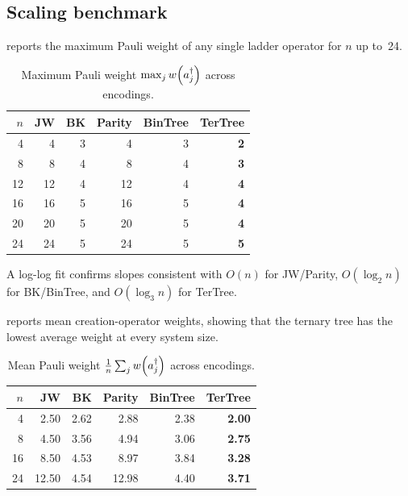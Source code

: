 \subsection{Scaling benchmark}
\label{sec:val-scaling}

 reports the maximum Pauli weight of any single
ladder operator for $n$ up to~24.

\begin{table}[t]
\centering
\caption{Maximum Pauli weight $\max_j w\!\left(a_{j}^{\dagger}\right)$ across encodings.}
\label{tab:scaling}
\begin{tabular}{@{}rrrrrr@{}}
\toprule
$n$ & JW & BK & Parity & BinTree & TerTree \\
\midrule
 4  &  4 &  3 &  4 &  3 & \textbf{2} \\
 8  &  8 &  4 &  8 &  4 & \textbf{3} \\
12  & 12 &  4 & 12 &  4 & \textbf{4} \\
16  & 16 &  5 & 16 &  5 & \textbf{4} \\
20  & 20 &  5 & 20 &  5 & \textbf{4} \\
24  & 24 &  5 & 24 &  5 & \textbf{5} \\
\bottomrule
\end{tabular}
\end{table}

A log-log fit confirms slopes consistent with $O(n)$ for JW/Parity,
$O(\log_2 n)$ for BK/BinTree, and $O(\log_3 n)$ for TerTree.

 reports mean creation-operator weights,
showing that the ternary tree has the lowest average weight at every
system size.

\begin{table}[t]
\centering
\caption{Mean Pauli weight $\frac{1}{n}\sum_j w\!\left(a_{j}^{\dagger}\right)$ across encodings.}
\label{tab:mean-weight}
\begin{tabular}{@{}rrrrrr@{}}
\toprule
$n$ & JW & BK & Parity & BinTree & TerTree \\
\midrule
 4  & 2.50 & 2.62 & 2.88 & 2.38 & \textbf{2.00} \\
 8  & 4.50 & 3.56 & 4.94 & 3.06 & \textbf{2.75} \\
16  & 8.50 & 4.53 & 8.97 & 3.84 & \textbf{3.28} \\
24  & 12.50& 4.54 &12.98 & 4.40 & \textbf{3.71} \\
\bottomrule
\end{tabular}
\end{table}

